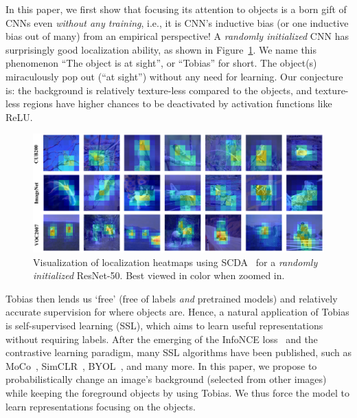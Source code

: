 \documentclass[letterpaper]{article}
\begin{document}
In this paper, we first show that focusing its attention to objects is a born gift of CNNs even \emph{without any training}, i.e., it is CNN's inductive bias (or one inductive bias out of many) from an empirical perspective! A \textit{randomly initialized} CNN has surprisingly good localization ability, as shown in Figure~\ref{fig:vis}. We name this phenomenon ``The object is at sight'', or ``Tobias'' for short. The object(s) miraculously pop out (``at sight'') without any need for learning. Our conjecture is: the background is relatively texture-less compared to the objects, and texture-less regions have higher chances to be deactivated by activation functions like ReLU.

\begin{figure}[t]
	\centering
	\includegraphics[width=\columnwidth]{visualization}
	\caption{Visualization of localization heatmaps using SCDA~\citep{scda:tip17} for a \textit{randomly initialized} ResNet-50. Best viewed in color when zoomed in.}
	\label{fig:vis}
\end{figure}

Tobias then lends us `free' (free of labels \emph{and} pretrained models) and relatively accurate supervision for where objects are. Hence, a natural application of Tobias is self-supervised learning (SSL), which aims to learn useful representations without requiring labels. After the emerging of the InfoNCE loss~\citep{InfoNCE:arxiv2018} and the contrastive learning paradigm, many SSL algorithms have been published, such as MoCo~\citep{moco:kaiming:CVPR20}, SimCLR~\citep{simclr:hinton:ICML20}, BYOL~\citep{byol:grill:NIPS20}, and many more. In this paper, we propose to probabilistically change an image's background (selected from other images) while keeping the foreground objects by using Tobias. We thus force the model to learn representations focusing on the objects.
\end{document}

